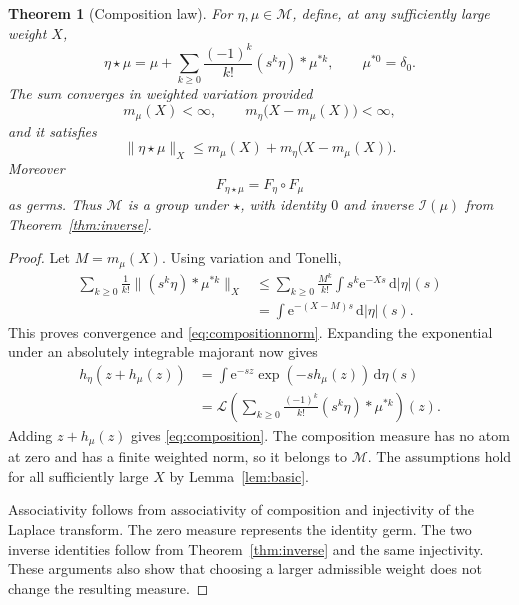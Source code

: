 \documentclass[11pt,a4paper]{article}
\newtheorem{theorem}{Theorem}[section]
\theoremstyle{definition}
\theoremstyle{remark}
\newcommand{\Lap}{\mathcal L}
\newcommand{\Inv}{\mathcal I}
\newcommand{\dd}{\,\mathrm d}
\newcommand{\e}{\mathrm e}
\newcommand{\normx}[2]{\lVert #1\rVert_{#2}}
\numberwithin{equation}{section}
\begin{document}
\begin{theorem}[Composition law]\label{thm:composition}
For $\eta,\mu\in\mathcal M$, define, at any sufficiently large weight $X$,
\begin{equation}\label{eq:star}
 \eta\star\mu
 =\mu+\sum_{k\ge0}\frac{(-1)^k}{k!}
       (s^k\eta)*\mu^{*k},\qquad \mu^{*0}=\delta_0.
\end{equation}
The sum converges in weighted variation provided
\[
 m_\mu(X)<\infty,\qquad m_\eta\bigl(X-m_\mu(X)\bigr)<\infty,
\]
and it satisfies
\begin{equation}\label{eq:compositionnorm}
 \normx{\eta\star\mu}{X}
 \le m_\mu(X)+m_\eta\bigl(X-m_\mu(X)\bigr).
\end{equation}
Moreover
\begin{equation}\label{eq:composition}
 F_{\eta\star\mu}=F_\eta\circ F_\mu
\end{equation}
as germs. Thus $\mathcal M$ is a group under $\star$, with identity $0$ and inverse $\Inv(\mu)$ from Theorem~\ref{thm:inverse}.
\end{theorem}
\begin{proof}
Let $M=m_\mu(X)$. Using variation and Tonelli,
\begin{align*}
 \sum_{k\ge0}\frac1{k!}
 \normx{(s^k\eta)*\mu^{*k}}{X}
 &\le \sum_{k\ge0}\frac{M^k}{k!}
             \int s^k\e^{-Xs}\dd|\eta|(s)\\
 &=\int\e^{-(X-M)s}\dd|\eta|(s).
\end{align*}
This proves convergence and \eqref{eq:compositionnorm}. Expanding the exponential under an absolutely integrable majorant now gives
\begin{align*}
 h_\eta(z+h_\mu(z))
 &=\int\e^{-sz}\exp(-s h_\mu(z))\dd\eta(s)\\
 &=\Lap\left(\sum_{k\ge0}\frac{(-1)^k}{k!}
          (s^k\eta)*\mu^{*k}\right)(z).
\end{align*}
Adding $z+h_\mu(z)$ gives \eqref{eq:composition}. The composition measure has no atom at zero and has a finite weighted norm, so it belongs to $\mathcal M$. The assumptions hold for all sufficiently large $X$ by Lemma~\ref{lem:basic}.

Associativity follows from associativity of composition and injectivity of the Laplace transform. The zero measure represents the identity germ. The two inverse identities follow from Theorem~\ref{thm:inverse} and the same injectivity. These arguments also show that choosing a larger admissible weight does not change the resulting measure.
\end{proof}
\end{document}

